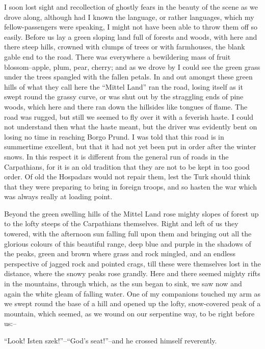 \documentclass[12pt,openright]{book}
\begin{document}
I soon lost sight and recollection of ghostly fears in the beauty of the scene as we drove along, although had I known the language, or rather languages, which my fellow-passengers were speaking, I might not have been able to throw them off so easily. Before us lay a green sloping land full of forests and woods, with here and there steep hills, crowned with clumps of trees or with farmhouses, the blank gable end to the road. There was everywhere a bewildering mass of fruit blossom–apple, plum, pear, cherry; and as we drove by I could see the green grass under the trees spangled with the fallen petals. In and out amongst these green hills of what they call here the “Mittel Land” ran the road, losing itself as it swept round the grassy curve, or was shut out by the straggling ends of pine woods, which here and there ran down the hillsides like tongues of flame. The road was rugged, but still we seemed to fly over it with a feverish haste. I could not understand then what the haste meant, but the driver was evidently bent on losing no time in reaching Borgo Prund. I was told that this road is in summertime excellent, but that it had not yet been put in order after the winter snows. In this respect it is different from the general run of roads in the Carpathians, for it is an old tradition that they are not to be kept in too good order. Of old the Hospadars would not repair them, lest the Turk should think that they were preparing to bring in foreign troops, and so hasten the war which was always really at loading point.

Beyond the green swelling hills of the Mittel Land rose mighty slopes of forest up to the lofty steeps of the Carpathians themselves. Right and left of us they towered, with the afternoon sun falling full upon them and bringing out all the glorious colours of this beautiful range, deep blue and purple in the shadows of the peaks, green and brown where grass and rock mingled, and an endless perspective of jagged rock and pointed crags, till these were themselves lost in the distance, where the snowy peaks rose grandly. Here and there seemed mighty rifts in the mountains, through which, as the sun began to sink, we saw now and again the white gleam of falling water. One of my companions touched my arm as we swept round the base of a hill and opened up the lofty, snow-covered peak of a mountain, which seemed, as we wound on our serpentine way, to be right before us:–

“Look! Isten szek!”–“God’s seat!”–and he crossed himself reverently.
\end{document}
